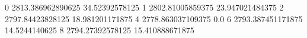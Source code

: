 0 2813.386962890625 34.52392578125
1 2802.81005859375 23.947021484375
2 2797.84423828125 18.981201171875
4 2778.863037109375 0.0
6 2793.387451171875 14.5244140625
8 2794.27392578125 15.410888671875

